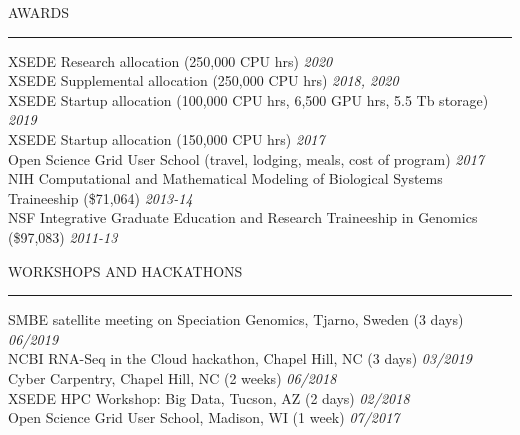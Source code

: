 \documentclass{resume} %
\renewenvironment{rSection}[1]{
\sectionskip
\textcolor{RoyalPurple}{\MakeUppercase{#1}}
\sectionlineskip
\hrule
\begin{list}{}{
\setlength{\leftmargin}{1.5em}
}
\item[]
}{
\end{list}
}
\begin{document}
\begin{rSection}{Awards}

XSEDE Research allocation (250,000 CPU hrs) \hfill{\em 2020}\\
XSEDE Supplemental allocation (250,000 CPU hrs) \hfill{\em 2018, 2020}\\
XSEDE Startup allocation (100,000 CPU hrs, 6,500 GPU hrs, 5.5 Tb storage) \hfill{\em 2019}\\
XSEDE Startup allocation (150,000 CPU hrs) \hfill{\em 2017}\\
Open Science Grid User School (travel, lodging, meals, cost of program) \hfill{\em 2017}\\
NIH Computational and Mathematical Modeling of Biological Systems Traineeship (\$71,064) \hfill {\em 2013-14}\\
NSF Integrative Graduate Education and Research Traineeship in Genomics (\$97,083) \hfill {\em 2011-13}\\

\end{rSection}



\begin{rSection}{Workshops and Hackathons}

SMBE satellite meeting on Speciation Genomics, Tjarno, Sweden (3 days) \hfill{\em 06/2019}\\
NCBI RNA-Seq in the Cloud hackathon, Chapel Hill, NC (3 days) \hfill {\em 03/2019}\\
Cyber Carpentry, Chapel Hill, NC (2 weeks) \hfill {\em 06/2018}\\
XSEDE HPC Workshop: Big Data, Tucson, AZ (2 days) \hfill {\em 02/2018}\\
Open Science Grid User School, Madison, WI (1 week) \hfill {\em 07/2017}

\end{rSection}


\end{document}
